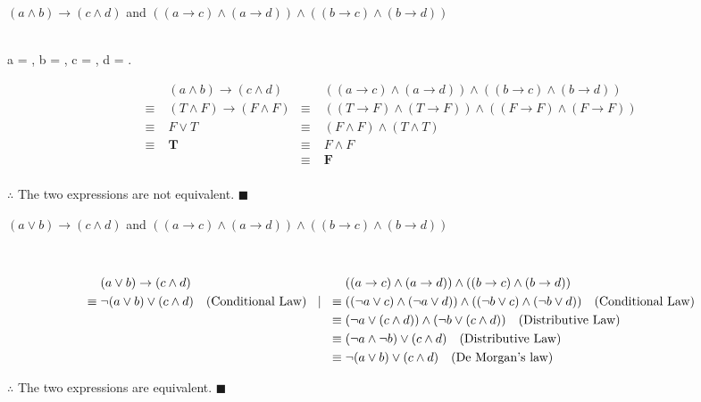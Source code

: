 \documentclass[]{article}
\begin{document}
\begin{question}
    $(a \land b) \rightarrow (c \land d)$ and $((a \rightarrow c) \land (a \rightarrow d)) \land ((b \rightarrow c) \land (b \rightarrow d))$
\end{question}
\begin{center}
         \\
         a = , b = , c = , d = .\\
\end{center}
\begin{align*}
    & (a \land b) \rightarrow (c \land d) & & ((a \rightarrow c) \land (a \rightarrow d)) \land ((b \rightarrow c) \land (b \rightarrow d))\\
    \equiv\; & (T \land F) \rightarrow (F \land F) & \equiv\; & ((T \rightarrow F) \land (T \rightarrow F)) \land ((F \rightarrow F) \land (F \rightarrow F)) \\
    \equiv\; & F \lor T & \equiv\; &  (F \land F) \land (T \land T)\\
    \equiv\; & \mathbf{T} & \equiv\; & F \land F \\
    & &  \equiv\; & \mathbf{F} \\
\end{align*}
\begin{center}
    $\therefore$ The two expressions are not equivalent. $\blacksquare$
\end{center}

\begin{question}
        $(a \lor b) \rightarrow (c \land d)$ and $((a \rightarrow c) \land (a \rightarrow d)) \land ((b \rightarrow c) \land (b \rightarrow d))$
\end{question}
\begin{center}
         \\
\end{center}
\begin{align*}
    & (a \lor b) \rightarrow (c \land d) & & ((a \rightarrow c) \land (a \rightarrow d)) \land ((b \rightarrow c) \land (b \rightarrow d))\\
    \equiv\; & \neg(a \lor b) \lor (c \land d) \quad \text{(Conditional Law)} \quad \vrule & \equiv\; & ((\neg a \lor c) \land (\neg a \lor d)) \land ((\neg b\lor c) \land (\neg b \lor d)) \quad \text{(Conditional Law)}\\
    & \quad \vrule & \equiv\; &  (\neg a \lor (c \land d))\land (\neg b \lor (c \land d)) \quad \text{(Distributive Law)}\\
    & \quad \vrule & \equiv\; & (\neg a \land \neg b ) \lor (c \land d) \quad \text{(Distributive Law)} \\
    & \quad \vrule &  \equiv\; & \neg(a \lor b) \lor (c \land d) \quad \text{(De Morgan's law)} \\
\end{align*}
\begin{center}
    $\therefore$ The two expressions are equivalent. $\blacksquare$
\end{center}
\end{document}
